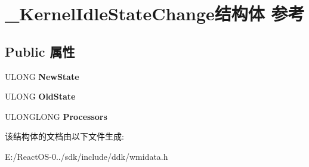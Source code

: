 \hypertarget{struct___kernel_idle_state_change}{}\section{\+\_\+\+Kernel\+Idle\+State\+Change结构体 参考}
\label{struct___kernel_idle_state_change}
\subsection*{Public 属性}
\begin{DoxyCompactItemize}
\item 
\mbox{\label{struct___kernel_idle_state_change_a3789c8ce9d1841d8ff519473f171f963}} 
U\+L\+O\+NG {\bfseries New\+State}
\item 
\mbox{\label{struct___kernel_idle_state_change_a0fb1ec0b40a7ea37007b92d4f7c8623b}} 
U\+L\+O\+NG {\bfseries Old\+State}
\item 
\mbox{\label{struct___kernel_idle_state_change_a1439ae5d1c45c2e785646635e57e91fa}} 
U\+L\+O\+N\+G\+L\+O\+NG {\bfseries Processors}
\end{DoxyCompactItemize}


该结构体的文档由以下文件生成\+:\begin{DoxyCompactItemize}
\item 
E\+:/\+React\+O\+S-\/0../sdk/include/ddk/wmidata.\+h\end{DoxyCompactItemize}
